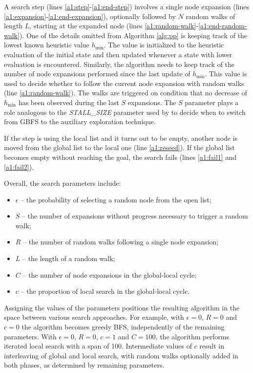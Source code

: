 \documentclass[letterpaper]{article} %
\begin{document}
A search step (lines \ref{a1:step}-\ref{a1:end-step}) involves a single node expansion (lines \ref{a1:expansion}-\ref{a1:end-expansion}), optionally followed by $N$ random walks of length $L$, starting at the expanded node (lines \ref{a1:random-walk}-\ref{a1:end-random-walk}). One of the details omitted from Algorithm \ref{alg:pp} is keeping track of the lowest known heuristic value $h_{\mathrm{min}}$. The value is initialized to the heuristic evaluation of the initial state and then updated whenever a state with lower evaluation is encountered. Similarly, the algorithm needs to keep track of the number of node expansions performed since the last update of $h_{\mathrm{min}}$. This value is used to decide whether to follow the current node expansion with random walks (line \ref{a1:random-walk}). The walks are triggered on condition that no decrease of $h_{\mathrm{min}}$ has been observed during the last $S$ expansions. The $S$ parameter plays a role analogous to the \emph{STALL\_SIZE} parameter used by \cite{Xie2014} to decide when to switch from GBFS to the auxiliary exploration technique.

If the step is using the local list and it turns out to be empty, another node is moved from the global list to the local one (line \ref{a1:reseed}). If the global list becomes empty without reaching the goal, the search fails (lines \ref{a1:fail1} and \ref{a1:fail2}).

Overall, the search parameters include:
\begin{itemize}
    \item $\epsilon$ -- the probability of selecting a random node from the open list;
    \item $S$ -- the number of expansions without progress necessary to trigger a random walk;
    \item $R$ -- the number of random walks following a single node expansion;
    \item $L$ -- the length of a random walk;
    \item $C$ -- the number of node expansions in the global-local cycle;
    \item $c$ -- the proportion of local search in the global-local cycle.
\end{itemize}

Assigning the values of the parameters positions the resulting algorithm in the space between various search approaches. For example, with $\epsilon=0$, $R=0$ and $c=0$ the algorithm becomes greedy BFS, independently of the remaining parameters. With $\epsilon=0$, $R=0$, $c=1$ and $C=100$, the algorithm performs iterated local search with a span of 100. Intermediate values of $c$ result in interleaving of global and local search, with random walks optionally added in both phases, as determined by remaining parameters.
\end{document}
